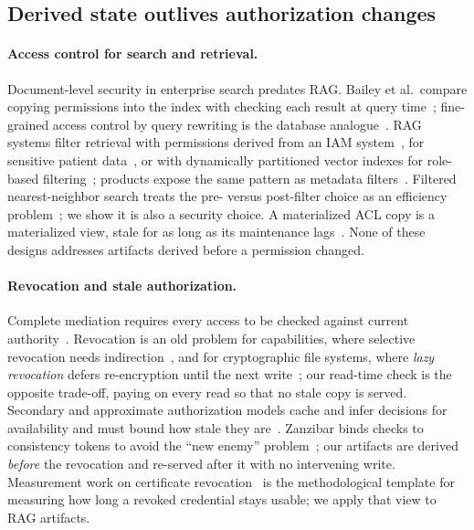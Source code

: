 \subsection{Derived state outlives authorization changes}
\paragraph{Access control for search and retrieval.}
Document-level security in enterprise search predates RAG. Bailey et al.\ compare copying
permissions into the index with checking each result at query time~\cite{bailey2006secure};
fine-grained access control by query rewriting is the database analogue~\cite{rizvi2004query}. RAG
systems filter retrieval with permissions derived from an IAM system~\cite{jeong2025permissionrag},
for sensitive patient data~\cite{chen2025integrating}, or with dynamically partitioned vector
indexes for role-based filtering~\cite{zhong2026honeybee}; products expose the same pattern as
metadata filters~\cite{doc_azure_trimming,doc_qdrant,doc_pinecone,doc_chroma}. Filtered
nearest-neighbor search treats the pre- versus post-filter choice as an efficiency
problem~\cite{gollapudi2023filtered,patel2024acorn}; we show it is also a security choice. A
materialized ACL copy is a materialized view, stale for as long as its maintenance
lags~\cite{gupta1995views}. None of these designs addresses artifacts derived before a permission
changed.

\paragraph{Revocation and stale authorization.}
Complete mediation requires every access to be checked against current
authority~\cite{saltzer1975protection}. Revocation is an old problem for capabilities, where
selective revocation needs indirection~\cite{redell1974selective}, and for cryptographic file
systems, where \emph{lazy revocation} defers re-encryption until the next
write~\cite{kallahalla2003plutus,backes2005lazy}; our read-time check is the opposite trade-off,
paying on every read so that no stale copy is served. Secondary and approximate authorization
models cache and infer decisions for availability and must bound how stale they
are~\cite{crampton2006saam,wei2009recycling}. Zanzibar binds checks to consistency tokens to avoid
the ``new enemy'' problem~\cite{pang2019zanzibar}; our artifacts are derived \emph{before} the
revocation and re-served after it with no intervening write. Measurement work on certificate
revocation~\cite{liu2015revocation} is the methodological template for measuring how long a revoked
credential stays usable; we apply that view to RAG artifacts.

